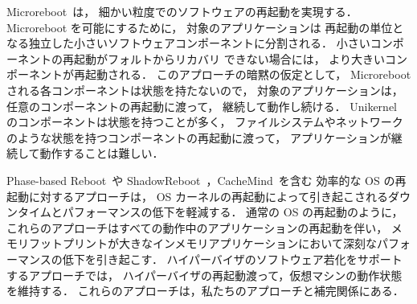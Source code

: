 Microreboot~\cite{CandeaEtAl-Microreboot}は，
細かい粒度でのソフトウェアの再起動を実現する．
Microreboot を可能にするために，
対象のアプリケーションは
再起動の単位となる独立した小さいソフトウェアコンポーネントに分割される．
小さいコンポーネントの再起動がフォルトからリカバリ できない場合には，
より大きいコンポーネントが再起動される．
このアプローチの暗黙の仮定として，
Microreboot される各コンポーネントは状態を持たないので，
対象のアプリケーションは，任意のコンポーネントの再起動に渡って，
継続して動作し続ける．
Unikernel のコンポーネントは状態を持つことが多く，
ファイルシステムやネットワークのような状態を持つコンポーネントの再起動に渡って，
アプリケーションが継続して動作することは難しい．

Phase-based Reboot~\cite{YamakitaEtAl-PBR}や ShadowReboot~\cite{YamadaEtAl-ShadowR}，CacheMind~\cite{KouraiEtAl-cachemind}を含む
効率的な OS の再起動に対するアプローチは，
OS カーネルの再起動によって引き起こされるダウンタイムとパフォーマンスの低下を軽減する．
通常の OS の再起動のように，これらのアプローチはすべての動作中のアプリケーションの再起動を伴い，
メモリフットプリントが大きなインメモリアプリケーションにおいて深刻なパフォーマンスの低下を引き起こす．
ハイパーバイザのソフトウェア若化をサポートするアプローチでは，
ハイパーバイザの再起動渡って，仮想マシンの動作状態を維持する．
これらのアプローチは，私たちのアプローチと補完関係にある．

